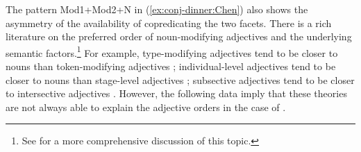 \documentclass[output=paper,colorlinks,citecolor=brown,chinesefont]{langscibook}
\begin{document}
%
%
%
%
The  pattern Mod1+Mod2+N in (\ref{ex:conj-dinner:Chen}) also shows the asymmetry of the availability of copredicating the two facets.
There is a rich literature on the preferred order of noun-modifying adjectives and the underlying semantic factors.\footnote{See \citet{Scontras:2023} for a more comprehensive discussion of this topic.}
For example, type-modifying adjectives tend to be closer to nouns than token-modifying adjectives \citep{mcnally2004relational}; individual-level adjectives tend to be closer to nouns than stage-level adjectives \citep{larson1998events}; subsective adjectives tend to be closer to intersective adjectives \citep{morzycki2016modification}. However, the following data imply that these theories are not always able to explain the adjective orders in the case of .

\end{document}
